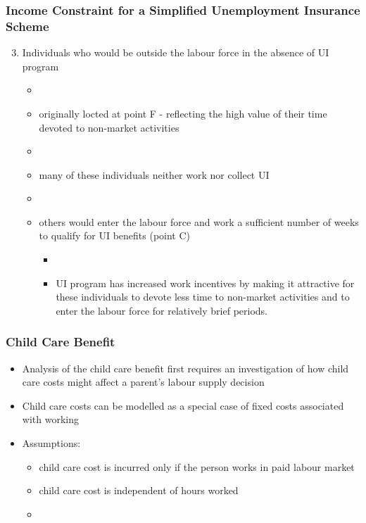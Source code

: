 \documentclass[blue]{beamer}
\begin{document}
 
  \begin{frame} \frametitle{Income Constraint for a Simplified Unemployment Insurance Scheme}




\begin{enumerate}
\setcounter{enumi}{2}
\item Individuals who would be outside the labour force in the absence of UI program
\begin{itemize}
\item[]
\item originally locted at point F -  reflecting the high value of their time devoted to non-market activities
\item[]
\item many of these individuals neither work nor collect UI
\item[]
\item others would enter the labour force and work a sufficient number of weeks to qualify for UI benefits (point C)
\begin{itemize}
\item[]
\item UI program has increased work incentives by making it attractive for these individuals to devote less time to non-market activities and to enter the labour force for relatively brief periods.
\end{itemize}
\end{itemize}
\end{enumerate}
 \end{frame}
 
 
 
 
 
 
 
 
 \begin{frame} \frametitle{Child Care Benefit}
\label{Child Care Benefit}

\begin{itemize}
\item Analysis of the child care benefit first requires an investigation of how child care costs might affect a parent's labour supply decision

\item Child care costs can be modelled as a special case of fixed costs associated with working

\item Assumptions:
\begin{itemize}


 \item child care cost is incurred only if the person works in paid labour market
\item child care cost is independent of hours worked
\item[]
\end{itemize}

 \end{itemize}
 \end{frame}
 
\end{document}
